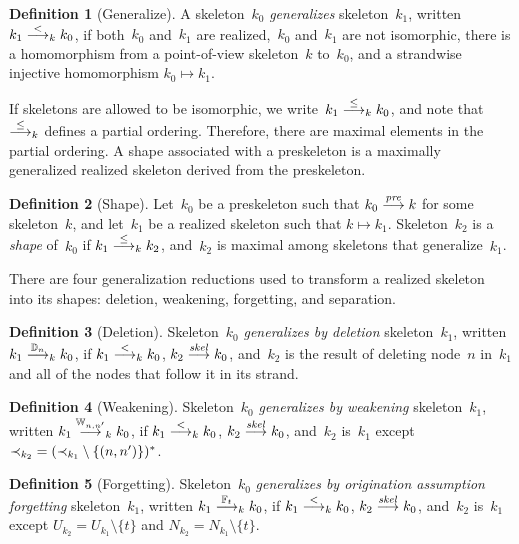 \documentclass[12pt]{report}
\theoremstyle{definition}
\newtheorem{defn}{Definition}[chapter]
\begin{document}
\begin{defn}[Generalize]
A skeleton~$k_0$ \emph{generalizes}
skeleton~$k_1$, written $k_1\stackrel{<}{\longrightarrow}_k k_0$, if
both~$k_0$ and~$k_1$ are realized,~$k_0$ and~$k_1$ are not isomorphic,
there is a homomorphism from a point-of-view skeleton~$k$ to~$k_0$, and
a strandwise injective homomorphism $k_0\mapsto k_1$.
\end{defn}

If skeletons are allowed to be isomorphic, we
write~$k_1\stackrel{\leq}{\longrightarrow}_k k_0$, and note that $\stackrel{\leq}{\longrightarrow}_k$
defines a partial ordering.  Therefore, there are maximal elements in
the partial ordering.  A shape associated with a preskeleton
is a maximally generalized realized skeleton derived from the
preskeleton.

\begin{defn}[Shape]
Let~$k_0$ be a preskeleton such that $k_0\stackrel{\operatorname{\mathit{pre}}}{\longrightarrow}k$ for
some skeleton~$k$, and let~$k_1$ be a realized skeleton such that
$k\mapsto k_1$.  Skeleton~$k_2$ is a \emph{shape}
of~$k_0$ if $k_1\stackrel{\leq}{\longrightarrow}_k k_2$, and~$k_2$ is maximal among
skeletons that generalize~$k_1$.
\end{defn}

There are four generalization reductions used to transform a realized
skeleton into its shapes: deletion, weakening, forgetting, and
separation.

\begin{defn}[Deletion]
Skeleton~$k_0$ \emph{generalizes by deletion}
skeleton~$k_1$, written $k_1\stackrel{\mathbb D_n}{\longrightarrow}_k k_0$, if
$k_1\stackrel{<}{\longrightarrow}_k k_0$, $k_2\stackrel{\operatorname{\mathit{skel}}}{\longrightarrow}k_0$, and~$k_2$ is
the result of deleting node~$n$ in~$k_1$ and all of the nodes that
follow it in its strand.
\end{defn}

\begin{defn}[Weakening]
Skeleton~$k_0$ \emph{generalizes by weakening}
skeleton~$k_1$, written $k_1\stackrel{\mathbb W_{n,n'}}{\longrightarrow}_k k_0$, if
$k_1\stackrel{<}{\longrightarrow}_k k_0$, $k_2\stackrel{\operatorname{\mathit{skel}}}{\longrightarrow}k_0$, and~$k_2$
is~$k_1$ except $\mathbin{\prec_{k_2}}=(\mathbin{\prec_{k_1}}\setminus\{(n,n')\})^\ast$.
\end{defn}

\begin{defn}[Forgetting]
Skeleton~$k_0$ \emph{generalizes by origination
  assumption forgetting} skeleton~$k_1$, written
$k_1\stackrel{\mathbb F_t}{\longrightarrow}_k k_0$, if $k_1\stackrel{<}{\longrightarrow}_k k_0$,
$k_2\stackrel{\operatorname{\mathit{skel}}}{\longrightarrow}k_0$, and~$k_2$ is~$k_1$ except
$U_{k_2}=U_{k_1}\setminus\{t\}$ and $N_{k_2}=N_{k_1}\setminus\{t\}$.
\end{defn}
\end{document}
